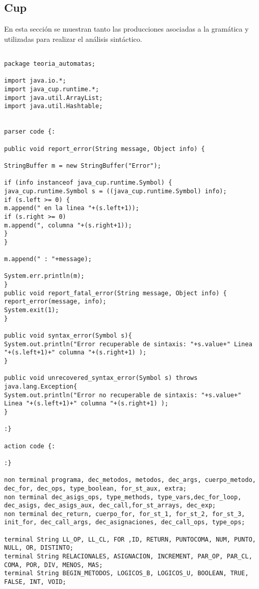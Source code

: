 \subsection{Cup}

En esta sección se muestran tanto las producciones asociadas a la gramática y utilizadas para realizar el análisis sintáctico. 

\begin{lstlisting}[caption=Analizador Sintáctico y Semántico en CUP]

package teoria_automatas;

import java.io.*;
import java_cup.runtime.*;
import java.util.ArrayList;
import java.util.Hashtable;


parser code {:

public void report_error(String message, Object info) {

StringBuffer m = new StringBuffer("Error");

if (info instanceof java_cup.runtime.Symbol) {
java_cup.runtime.Symbol s = ((java_cup.runtime.Symbol) info);
if (s.left >= 0) {                
m.append(" en la linea "+(s.left+1));   
if (s.right >= 0)                    
m.append(", columna "+(s.right+1));
}
}

m.append(" : "+message);

System.err.println(m);
}
public void report_fatal_error(String message, Object info) {
report_error(message, info);
System.exit(1);
}

public void syntax_error(Symbol s){
System.out.println("Error recuperable de sintaxis: "+s.value+" Linea "+(s.left+1)+" columna "+(s.right+1) );
}

public void unrecovered_syntax_error(Symbol s) throws java.lang.Exception{ 
System.out.println("Error no recuperable de sintaxis: "+s.value+" Linea "+(s.left+1)+" columna "+(s.right+1) );
}

:}

action code {:

:}

non terminal programa, dec_metodos, metodos, dec_args, cuerpo_metodo, dec_for, dec_ops, type_boolean, for_st_aux, extra;
non terminal dec_asigs_ops, type_methods, type_vars,dec_for_loop, dec_asigs, dec_asigs_aux, dec_call,for_st_arrays, dec_exp;
non terminal dec_return, cuerpo_for, for_st_1, for_st_2, for_st_3, init_for, dec_call_args, dec_asignaciones, dec_call_ops, type_ops;

terminal String LL_OP, LL_CL, FOR ,ID, RETURN, PUNTOCOMA, NUM, PUNTO, NULL, OR, DISTINTO;
terminal String RELACIONALES, ASIGNACION, INCREMENT, PAR_OP, PAR_CL, COMA, POR, DIV, MENOS, MAS;
terminal String BEGIN_METODOS, LOGICOS_B, LOGICOS_U, BOOLEAN, TRUE, FALSE, INT, VOID;


\end{lstlisting}
